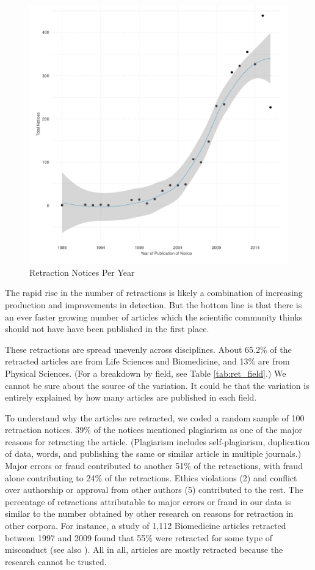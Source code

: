 \documentclass[12pt, letterpaper]{article}
\begin{document}
\begin{figure}[H]
\centering
\includegraphics[scale=.7]{../figs/n_retraction_notices_by_year.pdf}
\caption{Retraction Notices Per Year}
\label{fig:n_retraction_notices_per_year}
\end{figure}

The rapid rise in the number of retractions is likely a combination of increasing production and improvements in detection. But the bottom line is that there is an ever faster growing number of articles which the scientific community thinks should not have have been published in the first place. 

These retractions are spread unevenly across disciplines. About 65.2\% of the retracted articles are from Life Sciences and Biomedicine, and 13\% are from Physical Sciences. (For a breakdown by field, see Table \ref{tab:ret_field}.) We cannot be sure about the source of the variation. It could be that the variation is entirely explained by how many articles are published in each field.

To understand why the articles are retracted, we coded a random sample of 100 retraction notices. 39\% of the notices mentioned plagiarism as one of the major reasons for retracting the article. (Plagiarism includes self-plagiarism, duplication of data, words, and publishing the same or similar article in multiple journals.) Major errors or fraud contributed to another 51\% of the retractions, with fraud alone contributing to 24\% of the retractions. Ethics violations (2) and conflict over authorship or approval from other authors (5) contributed to the rest. The percentage of retractions attributable to major errors or fraud in our data is similar to the number obtained by other research on reasons for retraction in other corpora. For instance, a study of 1,112 Biomedicine articles retracted between 1997 and 2009 found that 55\% were retracted for some type of misconduct \citep{budd2011retracted} (see also \citet{steen2010retractions}). All in all, articles are mostly retracted because the research cannot be trusted.
\end{document}
